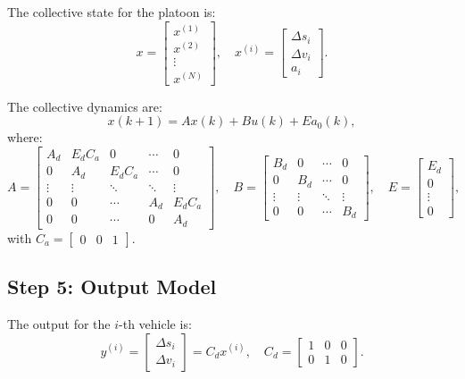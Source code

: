 \documentclass{article}
\begin{document}
The collective state for the platoon is:
\[
x = \begin{bmatrix} x^{(1)} \\ x^{(2)} \\ \vdots \\ x^{(N)} \end{bmatrix}, \quad x^{(i)} = \begin{bmatrix} \Delta s_i \\ \Delta v_i \\ a_i \end{bmatrix}.
\]

The collective dynamics are:
\[
x(k+1) = A x(k) + B u(k) + E a_0(k),
\]
where:
\[
A = \begin{bmatrix}
A_d & E_d C_a & 0 & \cdots & 0 \\
0 & A_d & E_d C_a & \cdots & 0 \\
\vdots & \vdots & \ddots & \ddots & \vdots \\
0 & 0 & \cdots & A_d & E_d C_a \\
0 & 0 & \cdots & 0 & A_d
\end{bmatrix}, \quad
B = \begin{bmatrix}
B_d & 0 & \cdots & 0 \\
0 & B_d & \cdots & 0 \\
\vdots & \vdots & \ddots & \vdots \\
0 & 0 & \cdots & B_d
\end{bmatrix}, \quad
E = \begin{bmatrix} E_d \\ 0 \\ \vdots \\ 0 \end{bmatrix},
\]
with $C_a = \begin{bmatrix} 0 & 0 & 1 \end{bmatrix}$.

\subsection{Step 5: Output Model}

The output for the $i$-th vehicle is:
\[
y^{(i)} = \begin{bmatrix} \Delta s_i \\ \Delta v_i \end{bmatrix} = C_d x^{(i)}, \quad C_d = \begin{bmatrix} 1 & 0 & 0 \\ 0 & 1 & 0 \end{bmatrix}.
\]
\end{document}
